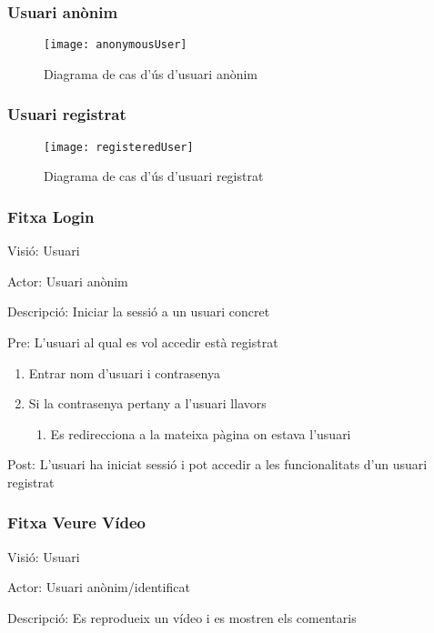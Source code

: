 \documentclass[12pt, titlepage]{article}
\begin{document}
\subsubsection{Usuari anònim}

\begin{figure}[H]
\centering
\texttt{[image: anonymousUser]}
\caption{Diagrama de cas d'ús d'usuari anònim}
\label{anonUser}
\end{figure}

\clearpage

\subsubsection{Usuari registrat}
\begin{figure}[H]
\centering
\texttt{[image: registeredUser]}
\caption{Diagrama de cas d'ús d'usuari registrat}
\label{regUser}
\end{figure}

\clearpage

\subsubsection{Fitxa Login}

Visió: Usuari

Actor: Usuari anònim

Descripció: Iniciar la sessió a un usuari concret

Pre: L’usuari al qual es vol accedir està registrat

\begin{enumerate}
\item Entrar nom d’usuari i contrasenya
\item Si la contrasenya pertany a l’usuari llavors
\begin{enumerate}
\item Es redirecciona a la mateixa pàgina on estava l’usuari
\end{enumerate}
\end{enumerate}

Post: L’usuari ha iniciat sessió i pot accedir a les funcionalitats d’un usuari registrat


\subsubsection{Fitxa Veure Vídeo}
Visió: Usuari

Actor: Usuari anònim/identificat

Descripció: Es reprodueix un vídeo i es mostren els comentaris
\end{document}

